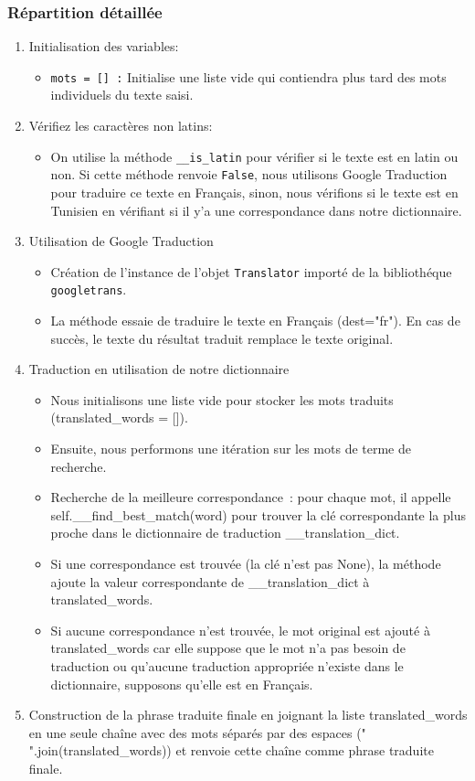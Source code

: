 \subsubsection{Répartition détaillée}
\begin{enumerate}
	\item Initialisation des variables:
	      \begin{itemize}
		      \item \texttt{mots = [] :} Initialise une liste vide qui contiendra plus tard des mots individuels du texte saisi.
	      \end{itemize}
	\item Vérifiez les caractères non latins:
	      \begin{itemize}
		      \item On utilise la méthode \texttt{\_\_is\_latin} pour vérifier si le texte est en latin ou non. Si cette méthode renvoie \texttt{False}, nous utilisons Google Traduction pour traduire ce texte en Français, sinon, nous vérifions si le texte est en Tunisien en vérifiant si il y'a une correspondance dans notre dictionnaire.
	      \end{itemize}
	\item Utilisation de Google Traduction
	      \begin{itemize}
		      \item Création de l'instance de l'objet \texttt{Translator} importé de la bibliothéque \texttt{googletrans}.
		      \item La méthode essaie de traduire le texte en Français (dest="fr"). En cas de succès, le texte du résultat traduit remplace le texte original.
	      \end{itemize}
	\item Traduction en utilisation de notre dictionnaire
	      \begin{itemize}
		      \item Nous initialisons une liste vide pour stocker les mots traduits (translated\_words = []).
		      \item Ensuite, nous performons une itération sur les mots de terme de recherche.
		      \item Recherche de la meilleure correspondance : pour chaque mot, il appelle self.\_\_find\_best\_match(word) pour trouver la clé correspondante la plus proche dans le dictionnaire de traduction \_\_translation\_dict.
		      \item Si une correspondance est trouvée (la clé n'est pas None), la méthode ajoute la valeur correspondante de \_\_translation\_dict à translated\_words.
		      \item Si aucune correspondance n'est trouvée, le mot original est ajouté à translated\_words car elle suppose que le mot n'a pas besoin de traduction ou qu'aucune traduction appropriée n'existe dans le dictionnaire, supposons qu'elle est en Français.
	      \end{itemize}
		\item Construction de la phrase traduite finale en joignant la liste translated\_words en une seule chaîne avec des mots séparés par des espaces (" ".join(translated\_words)) et renvoie cette chaîne comme phrase traduite finale.
\end{enumerate}

